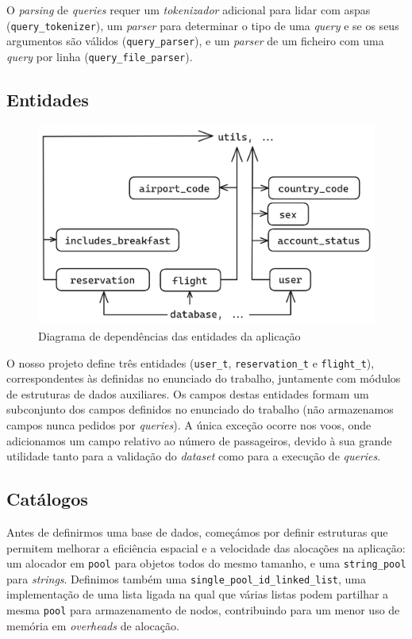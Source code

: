 \documentclass[12pt, a4paper]{article}
\begin{document}
O \emph{parsing} de \emph{queries} requer um \emph{tokenizador} adicional para lidar com aspas
(\texttt{query\_tokenizer}), um \emph{parser} para determinar o tipo de uma \emph{query} e se os
seus argumentos são válidos (\texttt{query\_parser}), e um \emph{parser} de um ficheiro com uma
\emph{query} por linha (\texttt{query\_file\_parser}).

\subsection{Entidades}
\label{sec:entities}

\begin{figure}[h]
    \centering
    \includegraphics[scale=0.2]{res/entities.png}
    \caption{Diagrama de dependências das entidades da aplicação}
    \label{fig:entities}
\end{figure}

O nosso projeto define três entidades (\texttt{user\_t}, \texttt{reservation\_t} e
\texttt{flight\_t}), correspondentes às definidas no enunciado do trabalho, juntamente com módulos
de estruturas de dados auxiliares. Os campos destas entidades formam um subconjunto dos campos
definidos no enunciado do trabalho (não armazenamos campos nunca pedidos por \emph{queries}). A
única exceção ocorre nos voos, onde adicionamos um campo relativo ao número de passageiros, devido
à sua grande utilidade tanto para a validação do \emph{dataset} como para a execução de
\emph{queries}.

\subsection{Catálogos}
\label{sec:catalogs}

Antes de definirmos uma base de dados, começámos por definir estruturas que permitem melhorar a
eficiência espacial e a velocidade das alocações na aplicação: um alocador em \texttt{pool} para
objetos todos do mesmo tamanho, e uma \texttt{string\_pool} para \emph{strings}. Definimos também
uma \texttt{single\_pool\_id\_linked\_list}, uma implementação de uma lista ligada na qual que
várias listas podem partilhar a mesma \texttt{pool} para armazenamento de nodos, contribuindo para
um menor uso de memória em \emph{overheads} de alocação.
\end{document}
